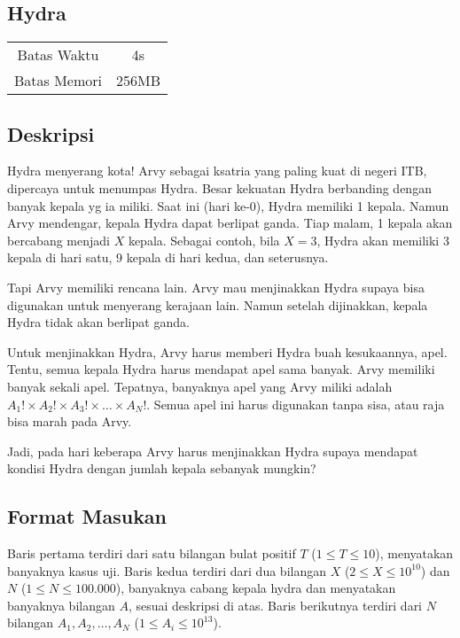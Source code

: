 \documentclass{article}
\begin{document}
\begin{center}
    \section*{Hydra}

    \begin{tabular}{ | c c | }
        \hline
        Batas Waktu  & 4s \\
        Batas Memori & 256MB \\
        \hline
    \end{tabular}
\end{center}

\subsection*{Deskripsi}

Hydra menyerang kota! Arvy sebagai ksatria yang paling kuat di negeri ITB, dipercaya untuk menumpas Hydra.
Besar kekuatan Hydra berbanding dengan banyak kepala yg ia miliki.
Saat ini (hari ke-0), Hydra memiliki 1 kepala. Namun Arvy mendengar, kepala Hydra dapat berlipat ganda.
Tiap malam, 1 kepala akan bercabang menjadi $X$ kepala.
Sebagai contoh, bila $X = 3$, Hydra akan memiliki 3 kepala di hari satu, 9 kepala di hari kedua, dan seterusnya.

Tapi Arvy memiliki rencana lain. Arvy mau menjinakkan Hydra supaya bisa digunakan untuk menyerang kerajaan lain.
Namun setelah dijinakkan, kepala Hydra tidak akan berlipat ganda.

Untuk menjinakkan Hydra, Arvy harus memberi Hydra buah kesukaannya, apel.
Tentu, semua kepala Hydra harus mendapat apel sama banyak.
Arvy memiliki banyak sekali apel.
Tepatnya, banyaknya apel yang Arvy miliki adalah $A_1! \times A_2! \times A_3! \times \dots \times A_N!$.
Semua apel ini harus digunakan tanpa sisa, atau raja bisa marah pada Arvy.

Jadi, pada hari keberapa Arvy harus menjinakkan Hydra supaya mendapat kondisi Hydra dengan jumlah kepala sebanyak mungkin?

\subsection*{Format Masukan}
Baris pertama terdiri dari satu bilangan bulat positif $T$ ($1 \leq T \leq 10$), menyatakan banyaknya kasus uji.
Baris kedua terdiri dari dua bilangan $X$ ($2 \leq X \leq {10}^{10}$) dan $N$ ($1 \leq N \leq 100.000$), banyaknya cabang kepala hydra dan menyatakan banyaknya bilangan $A$, sesuai deskripsi di atas.
Baris berikutnya terdiri dari $N$ bilangan $A_1, A_2, \dots, A_N$ ($1 \leq A_i \leq {10}^{13}$).
\end{document}
